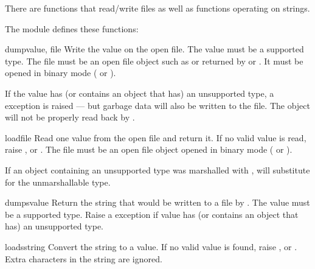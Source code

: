 There are functions that read/write files as well as functions
operating on strings.

The module defines these functions:

\begin{funcdesc}{dump}{value, file}
  Write the value on the open file.  The value must be a supported
  type.  The file must be an open file object such as
   or returned by  or
  .  It must be opened in binary mode
  ( or ).

  If the value has (or contains an object that has) an unsupported type,
  a  exception is raised --- but garbage data
  will also be written to the file.  The object will not be properly
  read back by .
\end{funcdesc}

\begin{funcdesc}{load}{file}
  Read one value from the open file and return it.  If no valid value
  is read, raise ,  or
  .  The file must be an open file object opened
  in binary mode ( or ).

   If an object containing an unsupported type was
  marshalled with ,  will substitute
   for the unmarshallable type.
\end{funcdesc}

\begin{funcdesc}{dumps}{value}
  Return the string that would be written to a file by
  .  The value must be a supported
  type.  Raise a  exception if value has (or
  contains an object that has) an unsupported type.
\end{funcdesc}

\begin{funcdesc}{loads}{string}
  Convert the string to a value.  If no valid value is found, raise
  ,  or
  .  Extra characters in the string are ignored.
\end{funcdesc}

